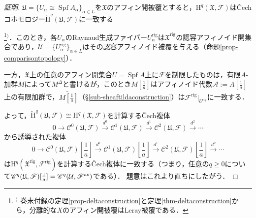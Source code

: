 \documentclass[a4paper,12pt, dvipdfmx]{jsbook}
\def\til#1{\widetilde{#1}}%
\def\rig{\mathop{\mathrm{rig}}\nolimits}
\def\Spf{\mathop{\mathrm{Spf}}\nolimits}
\def\H{\mathrm{H}}
\def\vH{\mathrm{\check{H}}}
\def\an{\textsl{an}}
\theoremstyle{plain}
\theoremstyle{definition}
\newcounter{chushaku}
\def\chu#1{\addtocounter{chushaku}{1}\footnote[\value{chushaku}]{${}^)$ #1}${}^)$}
\begin{document}
\begin{proof}[証明]
$\mathfrak{U}=\{U_{\alpha}\cong\Spf A_{\alpha}\}_{\alpha\in L}$を$\mathfrak{X}$のアフィン開被覆とすると，$\H^q(\mathfrak{X},\mathscr{F})$は\v{C}echコホモロジー$\vH^q(\mathfrak{U},\mathscr{F})$に一致する\chu{巻末付録の定理\ref{prop-deltaconstruction}と定理\ref{thm-deltaconstruction}から，分離的な$X$のアフィン開被覆はLeray被覆である．}．このとき，各$U_{\alpha}$のRaynaud生成ファイバー$U^{\rig}_{\alpha}$は$\mathfrak{X}^{\rig}$の認容アフィノイド開集合であり，$\mathcal{U}=\{U^{\rig}_{\alpha}\}_{\alpha\in L}$はその認容アフィノイド被覆を与える（命題\ref{prop-comparisontopology}）．

一方，$\mathfrak{X}$上の任意のアフィン開集合$U=\Spf A$上に$\mathscr{F}$を制限したものは，有限$A$-加群$M$によって$M^{\Delta}$と書けるが，このとき$M[\frac{1}{a}]$はアフィノイド代数$\mathcal{A}:=A[\frac{1}{a}]$上の有限加群で，$\til{M[\frac{1}{a}]}$（\S\ref{sub-sheaftildaconstruction}）は$\mathscr{F}^{\rig}|_{U^{\rig}}$に一致する．

よって，$\vH^q(\mathfrak{U},\mathscr{F})\cong\H^q(\mathfrak{X},\mathscr{F})$を計算する\v{C}ech複体
$$
0\longrightarrow\mathscr{C}^0(\mathfrak{U},\mathscr{F})\stackrel{d^0}{\longrightarrow}\mathscr{C}^1(\mathfrak{U},\mathscr{F})\stackrel{d^1}{\longrightarrow}\mathscr{C}^2(\mathfrak{U},\mathscr{F})\stackrel{d^2}{\longrightarrow}\cdots
$$
から誘導された複体
$$
0\longrightarrow\mathscr{C}^0(\mathfrak{U},\mathscr{F})[{\textstyle \frac{1}{a}}]\stackrel{d^0}{\longrightarrow}\mathscr{C}^1(\mathfrak{U},\mathscr{F})[{\textstyle \frac{1}{a}}]\stackrel{d^1}{\longrightarrow}\mathscr{C}^2(\mathfrak{U},\mathscr{F})[{\textstyle \frac{1}{a}}]\stackrel{d^2}{\longrightarrow}\cdots
$$
は$\H^q(\mathfrak{X}^{\rig},\mathscr{F}^{\rig})$を計算する\v{C}ech複体に一致する（つまり，任意の$q\geq 0$について$\mathscr{C}^q(\mathfrak{U},\mathscr{F})[{\textstyle \frac{1}{a}}]=\mathscr{C}^q(\mathcal{U},\mathscr{F}^{\an})$である）．
題意はこれより直ちにしたがう．
\end{proof}
\end{document}
